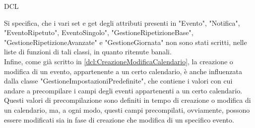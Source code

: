 \begin{listaPersonale}{DCL}
\begin{listaPersonale2}[DCL]{}
        Si specifica, che i vari set e get degli attributi presenti in "Evento", "Notifica", "EventoRipetuto", EventoSingolo", "GestioneRipetizioneBase", "GestioneRipetizioneAvanzate" e "GestioneGiornata" non sono stati scritti, nelle liste di funzioni di tali classi, in quanto ritenute banali. \\
        Infine, come già scritto in \ref{dcl:CreazioneModificaCalendario}, la creazione o modifica di un evento, appartenente a un certo calendario, è anche influenzata dalla classe "GestioneImpostazioniPredefinite", che contiene i valori con cui andare a precompilare i campi degli eventi appartenenti a un certo calendario. Questi valori di precompilazione sono definiti in tempo di creazione o modifica di un calendario, ma, a ogni modo, questi campi precompilati, ovviamente, possono essere modificati sia in fase di creazione che modifica di un specifico evento.

        \begin{center}
            
        \end{center}
        \newpage



\end{listaPersonale2}
\end{listaPersonale}
